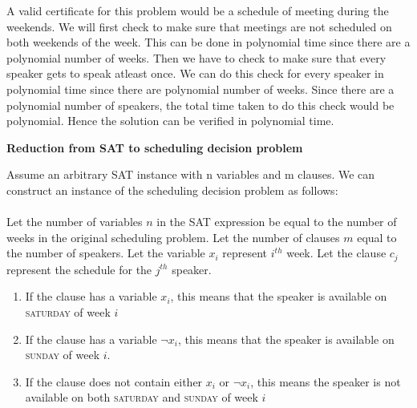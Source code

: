 \documentclass[11pt]{article}
\begin{document}
A valid certificate for this problem would be a schedule of meeting during the weekends. We will first check to make sure that meetings are not scheduled on both weekends of the week. This can be done in polynomial time since there are a polynomial number of weeks. Then we have to check to make sure that every speaker gets to speak atleast once. We can do this check for every speaker in polynomial time since there are polynomial number of weeks. Since there are a polynomial number of speakers, the total time taken to do this check would be polynomial. Hence the solution can be verified in polynomial time.

\textbf{Reduction from \textsc{SAT} to scheduling decision problem}

Assume an arbitrary SAT instance with n variables and m clauses. %
We can construct an instance of the scheduling decision problem as follows:\\\\
Let the number of variables $n$ in the SAT expression be equal to the number of weeks in the original scheduling problem. Let the number of clauses $m$ equal to the number of speakers. Let the variable $x_i$ represent $i^{th}$ week. Let the clause $c_j$ represent the schedule for the $j^{th}$ speaker. 
\begin{enumerate}
\item If the clause has a variable $x_i$, this means that the speaker is available on \textsc{saturday} of week $i$
\item If the clause has a variable $\neg x_i$, this means that the speaker is available on \textsc{sunday} of week $i$.
\item If the clause does not contain either $x_i$ or $\neg x_i$, this means the speaker is not available on both \textsc{saturday} and \textsc{sunday} of week $i$
\end{enumerate}
\end{document}
